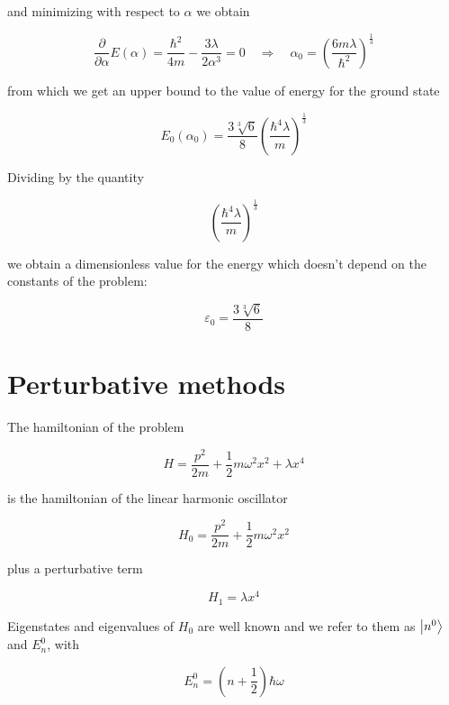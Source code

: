 \documentclass{article}
\begin{document}
and minimizing with respect to \( \alpha \) we obtain

\begin{equation}
\frac{\partial}{\partial\alpha} E(\alpha) = \frac{\hbar^2}{4m} -\frac{3\lambda}{2\alpha^3} = 0 \quad \Rightarrow \quad \alpha_0 = \left( \frac{6m\lambda}{\hbar^2} \right)^{\frac{1}{3}}
\end{equation}

from which we get an upper bound to the value of energy for the ground state

\begin{equation}
E_0(\alpha_0) = \frac{3\sqrt[3]{6}}{8} \left( \frac{\hbar^4 \lambda}{m} \right)^{\frac{1}{3}}
\end{equation}

Dividing by the quantity

\[ \left( \frac{\hbar^4 \lambda}{m} \right)^{\frac{1}{3}} \]

we obtain a dimensionless value for the energy which doesn't depend on the constants of the problem:

\begin{equation}
\varepsilon_0 = \frac{3\sqrt[3]{6}}{8}
\end{equation}

\section{Perturbative methods}

The hamiltonian of the problem 

\begin{equation}
H = \frac{p^2}{2m} + \frac{1}{2} m \omega^2 x^2 + \lambda x^4
\end{equation}

is the hamiltonian of the linear harmonic oscillator

\begin{equation}
H_0 = \frac{p^2}{2m} + \frac{1}{2} m \omega^2 x^2
\end{equation}

plus a perturbative term

\begin{equation}
H_1 = \lambda x^4
\end{equation}

Eigenstates and eigenvalues of \( H_0 \) are well known and we refer to them as \( \ket{n^0} \) and \( E_n^0 \), with

\begin{equation}
E_n^0 = \left(n + \frac{1}{2} \right) \hbar \omega
\end{equation}
\end{document}

